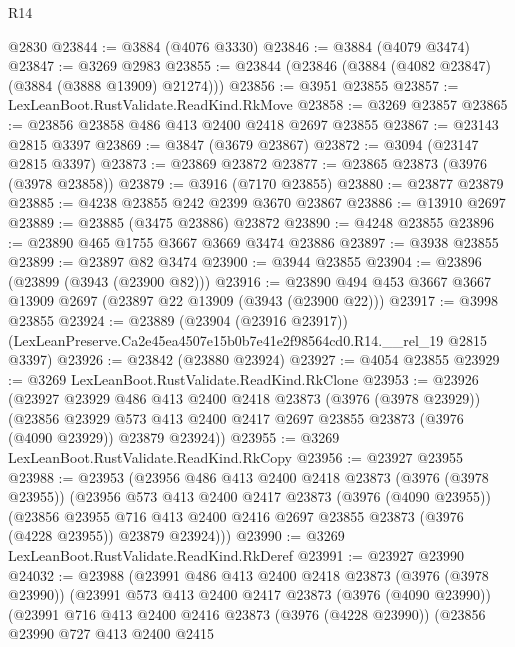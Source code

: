 \begin{lexlean}{R14}
\begin{coremodule}
    @2830
@23844 := @3884 (@4076 @3330)
@23846 := @3884 (@4079 @3474)
@23847 := @3269 @2983
@23855 := @23844 (@23846 (@3884 (@4082 @23847) (@3884 (@3888 @13909) @21274)))
@23856 := @3951 @23855
@23857 := LexLeanBoot.RustValidate.ReadKind.RkMove
@23858 := @3269 @23857
@23865 := @23856 @23858 @486 @413 @2400 @2418 @2697 @23855
@23867 := @23143 @2815 @3397
@23869 := @3847 (@3679 @23867)
@23872 := @3094 (@23147 @2815 @3397)
@23873 := @23869 @23872
@23877 := @23865 @23873 (@3976 (@3978 @23858))
@23879 := @3916 (@7170 @23855)
@23880 := @23877 @23879
@23885 := @4238 @23855 @242 @2399 @3670 @23867
@23886 := @13910 @2697
@23889 := @23885 (@3475 @23886) @23872
@23890 := @4248 @23855
@23896 := @23890 @465 @1755 @3667 @3669 @3474 @23886
@23897 := @3938 @23855
@23899 := @23897 @82 @3474
@23900 := @3944 @23855
@23904 := @23896 (@23899 (@3943 (@23900 @82)))
@23916 := @23890 @494 @453 @3667 @3667 @13909 @2697 (@23897 @22 @13909 (@3943 (@23900 @22)))
@23917 := @3998 @23855
@23924 := @23889
    (@23904 (@23916 @23917))
    (LexLeanPreserve.Ca2e45ea4507e15b0b7e41e2f98564cd0.R14.__rel_19 @2815 @3397)
@23926 := @23842 (@23880 @23924)
@23927 := @4054 @23855
@23929 := @3269 LexLeanBoot.RustValidate.ReadKind.RkClone
@23953 := @23926
    (@23927
      @23929
      @486
      @413
      @2400
      @2418
      @23873
      (@3976 (@3978 @23929))
      (@23856
        @23929
        @573
        @413
        @2400
        @2417
        @2697
        @23855
        @23873
        (@3976 (@4090 @23929))
        @23879
        @23924))
@23955 := @3269 LexLeanBoot.RustValidate.ReadKind.RkCopy
@23956 := @23927 @23955
@23988 := @23953
    (@23956
      @486
      @413
      @2400
      @2418
      @23873
      (@3976 (@3978 @23955))
      (@23956
        @573
        @413
        @2400
        @2417
        @23873
        (@3976 (@4090 @23955))
        (@23856
          @23955
          @716
          @413
          @2400
          @2416
          @2697
          @23855
          @23873
          (@3976 (@4228 @23955))
          @23879
          @23924)))
@23990 := @3269 LexLeanBoot.RustValidate.ReadKind.RkDeref
@23991 := @23927 @23990
@24032 := @23988
    (@23991
      @486
      @413
      @2400
      @2418
      @23873
      (@3976 (@3978 @23990))
      (@23991
        @573
        @413
        @2400
        @2417
        @23873
        (@3976 (@4090 @23990))
        (@23991
          @716
          @413
          @2400
          @2416
          @23873
          (@3976 (@4228 @23990))
          (@23856
            @23990
            @727
            @413
            @2400
            @2415

\end{coremodule}
\end{lexlean}
